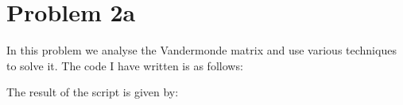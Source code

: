 \section{Problem 2a}

In this problem we analyse the Vandermonde matrix and use various techniques to solve it. The code I have written is as follows: 



The result of the script is given by:

%